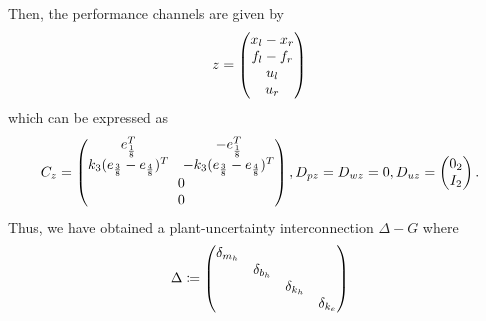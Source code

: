 Then, the performance channels are given by
\[
\begin{array}{rl}
z = \begin{pmatrix}x_l-x_r\\f_l-f_r\\u_l\\u_r\end{pmatrix}
\end{array}
\]
which can be expressed as
\[
C_z = \pmatr{e_\frac{1}{8}^T &-e_\frac{1}{8}^T\\k_3(e_\frac{3}{8} -e_\frac{4}{8})^T &-k_3(e_\frac{3}{8} -e_\frac{4}{8})^T\\ \multicolumn{2}{c}{0}\\ \multicolumn{2}{c}{0}},
D_{pz} = D_{wz} = 0,D_{uz} = \pmatr{0_2\\I_{2}}.
\]
Thus, we have obtained a plant-uncertainty interconnection $\Delta-G$ where 
\begin{equation}
\Delta\coloneqq \begin{pmatrix}\delta_{m_h}&&&\\&\delta_{b_h}&&\\&&\delta_{k_h}&\\&&&\delta_{k_e}\end{pmatrix}
\label{eq:realisticunc}
\end{equation}


%
%
%
%




